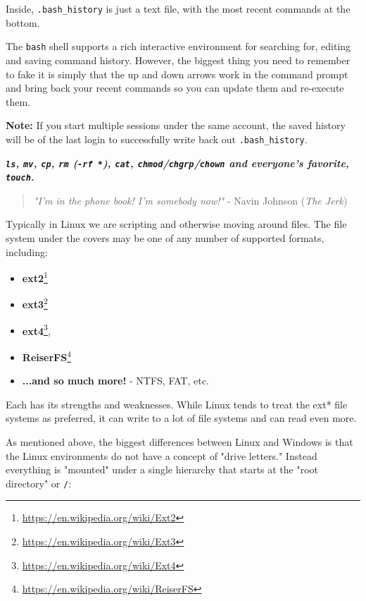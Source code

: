 \documentclass[10pt,]{book}
\renewcommand{\href}[2]{#2\footnote{\url{#1}}}
\numberwithin{figure}{chapter}
\begin{document}
Inside, \texttt{.bash\_history} is just a text file, with the most
recent commands at the bottom.

The \texttt{bash} shell supports a rich interactive environment for
searching for, editing and saving command history. However, the biggest
thing you need to remember to fake it is simply that the up and down
arrows work in the command prompt and bring back your recent commands so
you can update them and re-execute them.

\textbf{Note:} If you start multiple sessions under the same account,
the saved history will be of the last login to successfully write back
out \texttt{.bash\_history}.


\textbf{\emph{\texttt{ls}, \texttt{mv}, \texttt{cp}, \texttt{rm}
(\texttt{-rf *}), \texttt{cat},
\texttt{chmod}/\texttt{chgrp}/\texttt{chown} and everyone's favorite,
\texttt{touch}.}}

\begin{quote}
\emph{"I'm in the phone book! I'm somebody now!"} - Navin Johnson
(\emph{The Jerk})
\end{quote}

Typically in Linux we are scripting and otherwise moving around files.
The file system under the covers may be one of any number of supported
formats, including:

\begin{itemize}
\item
  \href{https://en.wikipedia.org/wiki/Ext2}{\textbf{ext2}}
\item
  \href{https://en.wikipedia.org/wiki/Ext3}{\textbf{ext3}}
\item
  \href{https://en.wikipedia.org/wiki/Ext4}{\textbf{ext4}},
\item
  \href{https://en.wikipedia.org/wiki/ReiserFS}{\textbf{ReiserFS}}
\item
  \textbf{...and so much more!} - NTFS, FAT, etc.
\end{itemize}

Each has its strengths and weaknesses. While Linux tends to treat the
ext* file systems as preferred, it can write to a lot of file systems
and can read even more.

As mentioned above, the biggest differences between Linux and Windows is
that the Linux environments do not have a concept of "drive letters."
Instead everything is "mounted" under a single hierarchy that starts at
the "root directory" or \texttt{/}:
\end{document}

